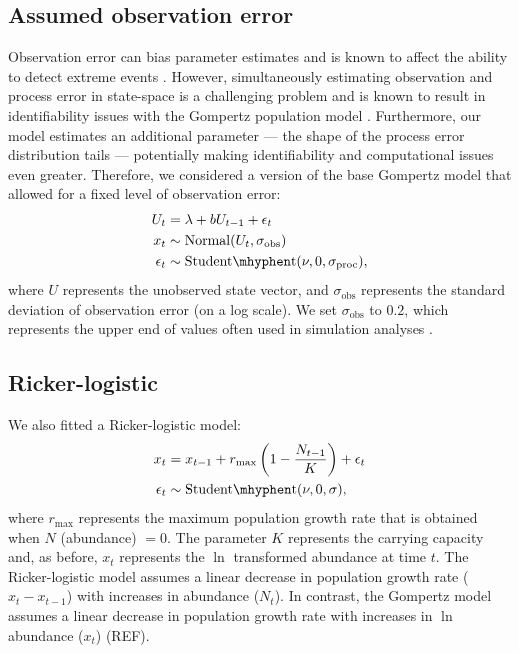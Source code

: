 \subsection{Assumed observation error}

Observation error can bias parameter estimates \citep[e.g.][]{knape2012} and is
known to affect the ability to detect extreme events \citep{ward2007}. However,
simultaneously estimating observation and process error in state-space is
a challenging problem and is known to result in identifiability issues with the
Gompertz population model \citep{knape2008}. Furthermore, our model estimates an
additional parameter --- the shape of the process error distribution tails ---
potentially making identifiability and computational issues even greater.
Therefore, we considered a version of the base Gompertz model that allowed for
a fixed level of observation error:
\begin{align*}
U_t &= \lambda + b U_{t-1} + \epsilon_t\\
x_t &\sim \mathrm{Normal}(U_t, \sigma_\mathrm{obs})\\
\epsilon_t &\sim \mathrm{Student\mhyphen t}(\nu, 0, \sigma_\mathrm{proc}),
\end{align*}
where $U$ represents the unobserved state vector, and $\sigma_\mathrm{obs}$
represents the standard deviation of observation error (on a log scale). We set
$\sigma_\mathrm{obs}$ to $0.2$, which represents the upper end of values often
used in simulation analyses \citep[e.g.][]{valpine2002, thorson2014b}.

\subsection{Ricker-logistic}

We also fitted a Ricker-logistic model:
\begin{align*}
x_t &= x_{t-1} + r_{\mathrm{max}}\left(1 - \frac{N_{t-1}}{K}\right) + \epsilon_t\\
\epsilon_t &\sim \mathrm{Student\mhyphen t}(\nu, 0, \sigma),
\end{align*}
where $r_\mathrm{max}$ represents the maximum population growth rate that is
obtained when $N$ (abundance) $= 0$. The parameter $K$ represents the carrying
capacity and, as before, $x_t$ represents the $\ln$ transformed abundance at
time $t$. The Ricker-logistic model assumes a linear decrease in population
growth rate ($x_t - x_{t-1}$) with increases in abundance ($N_t$). In contrast,
the Gompertz model assumes a linear decrease in population growth rate with
increases in $\ln$ abundance ($x_t$) (REF).

